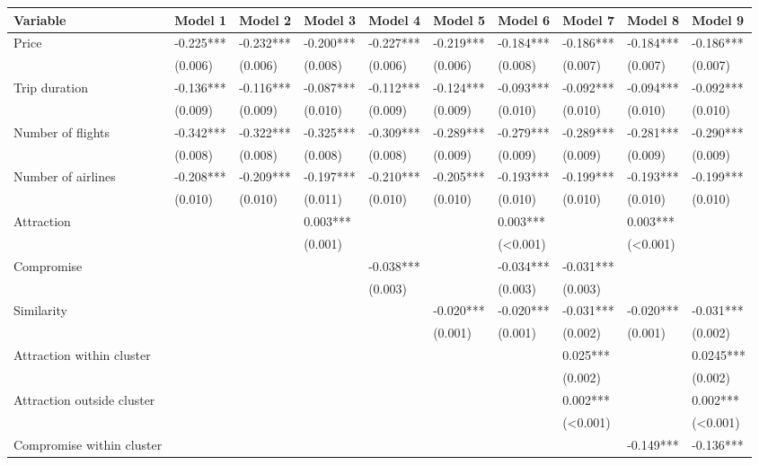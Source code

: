 \documentclass[a4paper,12pt]{article}
\begin{document}
\begin{table}
\centering
\begin{tabular}{p{5cm}|*{9}{p{1.7cm}}}
\hline
Variable & Model 1 & Model 2 & Model 3 & Model 4 & Model 5 & Model 6 & Model 7 & Model 8 & Model 9 \\ \hline
Price & -0.225*** & -0.232*** & -0.200*** & -0.227*** & -0.219*** & -0.184*** & -0.186*** & -0.184*** & -0.186*** \\ 
 & (0.006) & (0.006) & (0.008) & (0.006) & (0.006) & (0.008) & (0.007) & (0.007) & (0.007) \\ 
Trip duration & -0.136*** & -0.116*** & -0.087*** & -0.112*** & -0.124*** & -0.093*** & -0.092*** & -0.094*** & -0.092*** \\
 & (0.009) & (0.009) & (0.010) & (0.009) & (0.009) & (0.010) & (0.010) & (0.010) & (0.010) \\ 
Number of flights & -0.342*** & -0.322*** & -0.325*** & -0.309*** & -0.289*** & -0.279*** & -0.289*** & -0.281*** & -0.290*** \\ 
 & (0.008) & (0.008) & (0.008) & (0.008) & (0.009) & (0.009) & (0.009) & (0.009) & (0.009) \\
Number of airlines & -0.208*** & -0.209*** & -0.197*** & -0.210*** & -0.205*** & -0.193*** & -0.199*** & -0.193*** & -0.199*** \\
 & (0.010) & (0.010) & (0.011) & (0.010) & (0.010) & (0.010) & (0.010) & (0.010) & (0.010) \\ 
Attraction &  &  & 0.003*** &  &  & 0.003*** &  & 0.003*** &  \\ 
 &  &  & (0.001) &  &  & (<0.001) &  & (<0.001) &  \\ 
Compromise &  &  &  & -0.038*** &  & -0.034*** & -0.031*** &  &  \\ 
 &  &  &  & (0.003) &  & (0.003) & (0.003) &  &  \\ 
Similarity &  &  &  &  & -0.020*** & -0.020*** & -0.031*** & -0.020*** & -0.031*** \\ 
 &  &  &  &  & (0.001) & (0.001) & (0.002) & (0.001) & (0.002) \\ 
Attraction within cluster &  &  &  &  &  &  & 0.025*** &  & 0.0245*** \\ 
 &  &  &  &  &  &  & (0.002) &  & (0.002) \\ 
Attraction outside cluster &  &  &  &  &  &  & 0.002*** &  & 0.002*** \\ 
 &  &  &  &  &  &  & (<0.001) &  & (<0.001) \\ 
Compromise within cluster &  &  &  &  &  &  &  & -0.149*** & -0.136*** \\ 

\end{tabular}
\end{table}
\end{document}
